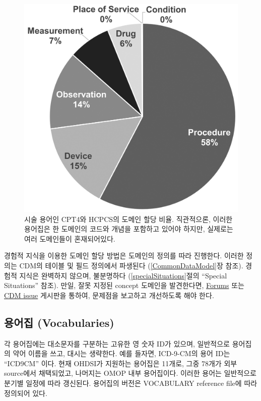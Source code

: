 \documentclass[11pt]{book}
\theoremstyle{definition}
\theoremstyle{definition}
\theoremstyle{definition}
\theoremstyle{remark}
\begin{document}
\begin{figure}

{\centering \includegraphics[width=0.7\linewidth]{images/StandardizedVocabularies/domains} 

}

\caption{시술 용어인 CPT4와 HCPCS의 도메인 할당 비율. 직관적으론, 이러한 용어집은 한 도메인의 코드와 개념을 포함하고 있어야 하지만, 실제로는 여러 도메인들이 혼재되어있다.}\label{fig:domains}
\end{figure}

경험적 지식을 이용한 도메인 할당 방법은 도메인의 정의를 따라 진행한다.
이러한 정의는 CDM의 테이블 및 필드 정의에서 파생된다
(\ref{CommonDataModel}장 참조). 경험적 지식은 완벽하지 않으며,
불분명하다 (\ref{specialSituations}절의 ``Special Situations'' 참조).
만일, 잘못 지정된 concept 도메인을 발견한다면,
\href{https://forums.ohdsi.org}{Forums} 또는
\href{https://github.com/OHDSI/CommonDataModel/issues}{CDM issue}
게시판을 통하여, 문제점을 보고하고 개선하도록 해야 한다.

\subsection{용어집 (Vocabularies)}\label{-vocabularies}

각 용어집에는 대소문자를 구분하는 고유한 영 숫자 ID가 있으며, 일반적으로
용어집의 약어 이름을 쓰고, 대시는 생략한다. 예를 들자면, ICD-9-CM의 용어
ID는 ``ICD9CM'' 이다. 현재 OHDSI가 지원하는 용어집은 11개로, 그중 78개가
외부 source에서 채택되었고, 나머지는 OMOP 내부 용어집이다. 이러한 용어는
일반적으로 분기별 일정에 따라 갱신된다. 용어집의 버전은 VOCABULARY
reference file에 따라 정의되어 있다. 
\end{document}
